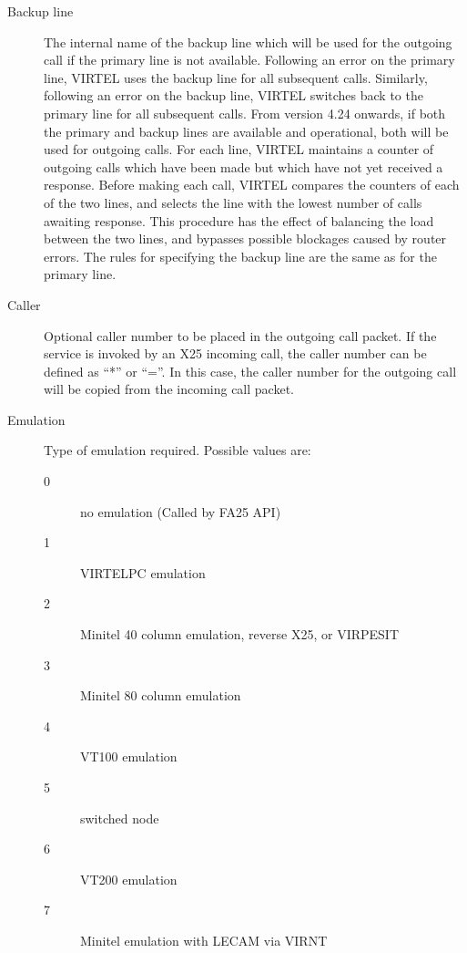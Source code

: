 \documentclass[letterpaper,10pt,english]{sphinxmanual}
\begin{document}
\begin{description}
\item[{Backup line}] \leavevmode
The internal name of the backup line which will be used for the outgoing call if the primary line is not available. Following an error on the primary line, VIRTEL uses the backup line for all subsequent calls. Similarly, following an error on the backup line, VIRTEL switches back to the primary line for all subsequent calls. From version 4.24 onwards, if both the primary and backup lines are available and operational, both will be used for outgoing calls. For each line, VIRTEL maintains a counter of outgoing calls which have been made but which have not yet received a response. Before making each call, VIRTEL compares the counters of each of the two lines, and selects the line with the lowest number of calls awaiting response. This procedure has the effect of balancing the load between the two lines, and bypasses possible blockages caused by router errors. The rules for specifying the backup line are the same as for the primary line.

\item[{Caller}] \leavevmode
Optional caller number to be placed in the outgoing call packet. If the service is invoked by an X25 incoming call, the caller number can be defined as “*” or “=”. In this case, the caller number for the outgoing call will be copied from the incoming call packet.

\item[{Emulation}] \leavevmode
Type of emulation required. Possible values are:
\begin{description}
\item[{0}] \leavevmode
no emulation (Called by FA25 API)

\item[{1}] \leavevmode
VIRTELPC emulation

\item[{2}] \leavevmode
Minitel 40 column emulation, reverse X25, or VIRPESIT

\item[{3}] \leavevmode
Minitel 80 column emulation

\item[{4}] \leavevmode
VT100 emulation

\item[{5}]  switched node

\item[{6}] \leavevmode
VT200 emulation

\item[{7}] \leavevmode
Minitel emulation with LECAM via VIRNT


\end{description}
\end{description}
\end{document}

